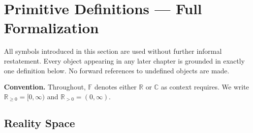 %
%
%
%

%
%

\section{Primitive Definitions — Full Formalization}
\label{sec:ch3:primitives}

All symbols introduced in this section are used without further informal
restatement.  Every object appearing in any later chapter is grounded in
exactly one definition below.  No forward references to undefined objects
are made.

\medskip
\noindent\textbf{Convention.}  Throughout, $\mathbb{F}$ denotes either
$\mathbb{R}$ or $\mathbb{C}$ as context requires.  We write
$\mathbb{R}_{\geq 0} = [0,\infty)$ and $\mathbb{R}_{>0} = (0,\infty)$.

\subsection{Reality Space}
\label{sec:ch3:reality}

